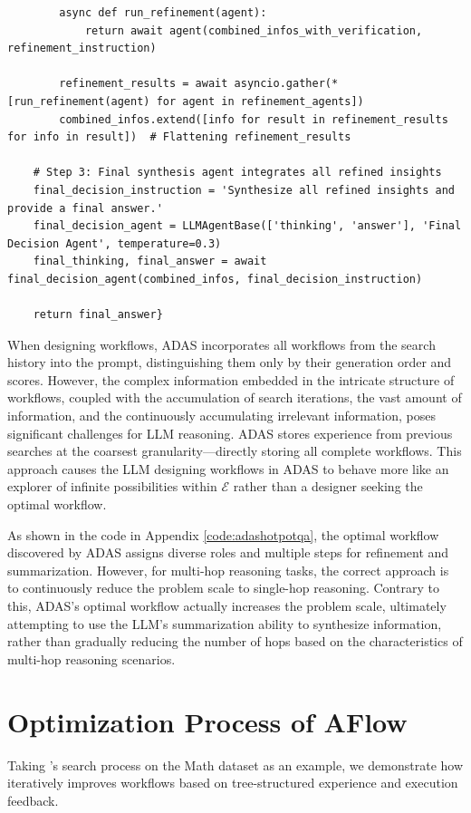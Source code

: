 \begin{tcolorbox}
\begin{verbatim}
        async def run_refinement(agent):
            return await agent(combined_infos_with_verification, refinement_instruction)
        
        refinement_results = await asyncio.gather(*[run_refinement(agent) for agent in refinement_agents])
        combined_infos.extend([info for result in refinement_results for info in result])  # Flattening refinement_results

    # Step 3: Final synthesis agent integrates all refined insights
    final_decision_instruction = 'Synthesize all refined insights and provide a final answer.'
    final_decision_agent = LLMAgentBase(['thinking', 'answer'], 'Final Decision Agent', temperature=0.3)
    final_thinking, final_answer = await final_decision_agent(combined_infos, final_decision_instruction)

    return final_answer}
\end{verbatim}
\end{tcolorbox}
\label{code:adashotpotqa}


When designing workflows, ADAS incorporates all workflows from the search history into the prompt, distinguishing them only by their generation order and scores. However, the complex information embedded in the intricate structure of workflows, coupled with the accumulation of search iterations, the vast amount of information, and the continuously accumulating irrelevant information, poses significant challenges for LLM reasoning. ADAS stores experience from previous searches at the coarsest granularity—directly storing all complete workflows. This approach causes the LLM designing workflows in ADAS to behave more like an explorer of infinite possibilities within $\mathcal{E}$ rather than a designer seeking the optimal workflow.


As shown in the code in Appendix \ref{code:adashotpotqa}, the optimal workflow discovered by ADAS assigns diverse roles and multiple steps for refinement and summarization. However, for multi-hop reasoning tasks, the correct approach is to continuously reduce the problem scale to single-hop reasoning. Contrary to this, ADAS's optimal workflow actually increases the problem scale, ultimately attempting to use the LLM's summarization ability to synthesize information, rather than gradually reducing the number of hops based on the characteristics of multi-hop reasoning scenarios. 

\section{Optimization Process of AFlow}
Taking \model's search process on the Math dataset as an example, we demonstrate how \model iteratively improves workflows based on tree-structured experience and execution feedback.
\label{sec:trajectory}
